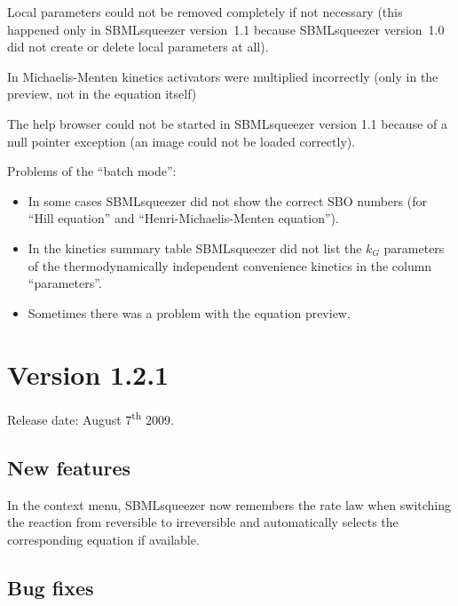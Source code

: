 \begin{dinglist}{54}
\item Local parameters could not be removed completely if not necessary (this happened
only in SBMLsqueezer version~1.1 because SBMLsqueezer version~1.0 did not create
or delete local parameters at all).

\item In Michaelis-Menten kinetics activators were multiplied incorrectly (only in the
preview, not in the equation itself)

\item The help browser could not be started in SBMLsqueezer version 1.1 because of a
null pointer exception (an image could not be loaded correctly).

\item Problems of the ``batch mode'':
\begin{itemize}
\item In some cases SBMLsqueezer did not show the correct SBO numbers (for 
      ``Hill equation'' and ``Henri-Michaelis-Menten equation'').
\item In the kinetics summary table SBMLsqueezer did not list the $k_G$
      parameters of the thermodynamically independent convenience kinetics in
      the column ``parameters''.
\item Sometimes there was a problem with the equation preview.
\end{itemize}
\end{dinglist}

\section{Version 1.2.1}

Release date: August 7\textsuperscript{th} 2009.

\subsection{New features}

\begin{dinglist}{52}
\item In the context menu, SBMLsqueezer now remembers the rate law when switching the
reaction from reversible to irreversible and automatically selects the
corresponding equation if available.
\end{dinglist}

\subsection{Bug fixes}

